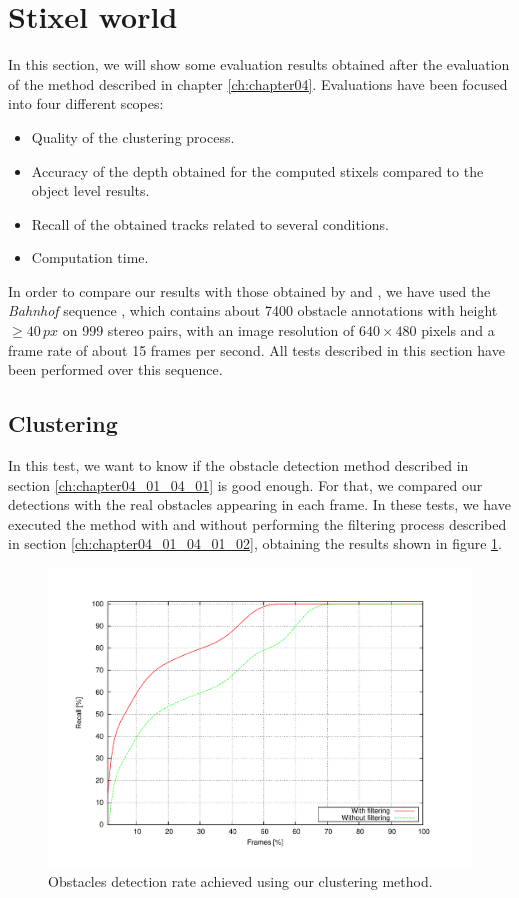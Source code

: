 \FloatBarrier

\graphicspath{{./images/chapter04/bmps/}{./images/chapter04/vects/}{./images/chapter04/}}
\section{Stixel world}\label{ch:chapter04_02}

In this section, we will show some evaluation results obtained after the evaluation of the method described in chapter \ref{ch:chapter04}. Evaluations have been focused into four different scopes: 

\begin{itemize}
 \item Quality of the clustering process.
 \item Accuracy of the depth obtained for the computed stixels compared to the object level results.
 \item Recall of the obtained tracks related to several conditions.
 \item Computation time.
\end{itemize}

In order to compare our results with those obtained by \cite{gunyel2012stixels} and \cite{benenson2011stixels}, we have used the \emph{Bahnhof} sequence \citep{ess2009robust}, which contains about 7400 obstacle annotations with height $\geq 40\,px$ on 999 stereo pairs, with an image resolution of $640 \times 480$ pixels and a frame rate of about 15 frames per second. All tests described in this section have been performed over this sequence.

\subsection{Clustering}\label{ch:chapter04_02_01}

In this test, we want to know if the obstacle detection method described in section \ref{ch:chapter04_01_04_01} is good enough. For that, we compared our detections with the real obstacles appearing in each frame. In these tests, we have executed the method with and without performing the filtering process described in section \ref{ch:chapter04_01_04_01_02}, obtaining the results shown in figure \ref{fig:cp04_detection_rate}.

\begin{figure}[h!]
\centering
\includegraphics[width=\textwidth,height=0.5\textwidth,trim=50 40 80 60,clip]{detectionRate}
\caption{Obstacles detection rate achieved using our clustering method.}\label{fig:cp04_detection_rate}
\end{figure}

